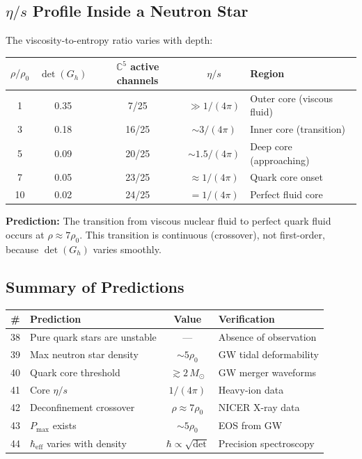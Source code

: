 \documentclass[12pt]{article}
\theoremstyle{remark}
\theoremstyle{definition}
\newcommand{\CC}{\mathbb{C}}
\begin{document}
\subsection{$\eta/s$ Profile Inside a Neutron Star}

The viscosity-to-entropy ratio varies with depth:

\begin{center}
\begin{tabular}{ccccl}
\hline
$\rho/\rho_0$ & $\det(G_h)$ & $\CC^5$ active channels & $\eta/s$ & Region \\
\hline
1 & 0.35 & 7/25 & $\gg 1/(4\pi)$ & Outer core (viscous fluid) \\
3 & 0.18 & 16/25 & $\sim 3/(4\pi)$ & Inner core (transition) \\
5 & 0.09 & 20/25 & $\sim 1.5/(4\pi)$ & Deep core (approaching) \\
7 & 0.05 & 23/25 & $\approx 1/(4\pi)$ & Quark core onset \\
10 & 0.02 & 24/25 & $= 1/(4\pi)$ & Perfect fluid core \\
\hline
\end{tabular}
\end{center}

\textbf{Prediction:} The transition from viscous nuclear fluid to perfect quark fluid occurs at $\rho \approx 7\rho_0$. This transition is continuous (crossover), not first-order, because $\det(G_h)$ varies smoothly.

\subsection{Summary of Predictions}

\begin{center}
\begin{tabular}{clcl}
\hline
\# & Prediction & Value & Verification \\
\hline
38 & Pure quark stars are unstable & --- & Absence of observation \\
39 & Max neutron star density & $\sim 5\rho_0$ & GW tidal deformability \\
40 & Quark core threshold & $\gtrsim 2\,M_\odot$ & GW merger waveforms \\
41 & Core $\eta/s$ & $1/(4\pi)$ & Heavy-ion data \\
42 & Deconfinement crossover & $\rho \approx 7\rho_0$ & NICER X-ray data \\
43 & $P_\text{max}$ exists & $\sim 5\rho_0$ & EOS from GW \\
44 & $\hbar_\text{eff}$ varies with density & $\hbar \propto \sqrt{\det}$ & Precision spectroscopy \\
\hline
\end{tabular}
\end{center}
\end{document}
